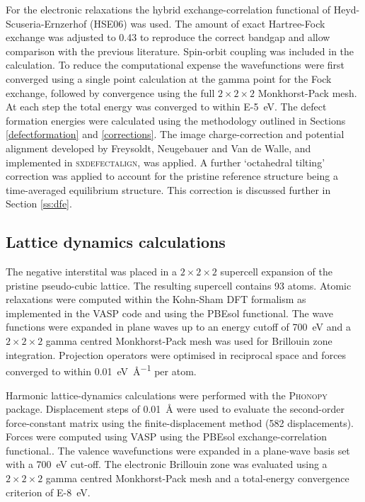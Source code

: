 For the electronic relaxations the hybrid exchange-correlation functional of Heyd-Scuseria-Ernzerhof (HSE06) was used.\autocite{Heyd2004a,Heyd2005a} The amount of exact Hartree-Fock exchange was adjusted to 0.43 to reproduce the correct bandgap and allow comparison with the previous literature.\autocite{Meggiolaro2018,Du2015} 
 Spin-orbit coupling was included in the calculation.
To reduce the computational expense the wavefunctions were first converged using a single point calculation at the gamma point for the Fock exchange, followed by convergence using the full $2\!\times\!2\!\times\!2$ Monkhorst-Pack mesh. At each step the total energy was converged to within \SI{E-5}{\electronvolt}.
The defect formation energies were calculated using the methodology outlined in Sections \ref{defectformation} and \ref{corrections}. The image charge-correction and potential alignment developed by Freysoldt, Neugebauer and Van de Walle, and implemented in \textsc{sxdefectalign},\autocite{sxdefectalign} was applied. A further `octahedral tilting' correction was applied to account for the pristine reference structure being a time-averaged equilibrium structure. This correction is discussed further in Section \ref{ss:dfe}.


\subsection{Lattice dynamics calculations}

The negative interstital was placed in a $2\!\times\!2\!\times\!2$ supercell expansion of the pristine pseudo-cubic lattice. The resulting supercell contains 93 atoms. Atomic relaxations were computed within the Kohn-Sham DFT formalism as implemented in the \textsc{VASP} code\autocite{Kresse1996a} and using the PBEsol functional. The wave functions were expanded in plane waves up to an energy cutoff of \SI{700}{\electronvolt} and a $2\! \times\! 2\! \times\! 2$ gamma centred Monkhorst-Pack mesh was used for Brillouin zone integration.  Projection operators were optimised in reciprocal space and forces converged to within \SI{0.01}{\electronvolt\per\angstrom} per atom.

Harmonic lattice-dynamics calculations were performed with the \textsc{Phonopy} package.\autocite{Togo2015} Displacement steps of \SI{0.01}{\angstrom} were used to evaluate the second-order force-constant matrix using the finite-displacement method (582 displacements).
Forces were computed using \textsc{VASP} using the PBEsol exchange-correlation functional.\autocite{Perdew2008a}.
The valence wavefunctions were expanded in a plane-wave basis set with a \SI{700}{\electronvolt} cut-off. The electronic Brillouin zone was evaluated using a $2\!\times\!2\!\times\!2$ gamma centred Monkhorst-Pack mesh and a total-energy convergence criterion of \SI{E-8}{\electronvolt}.

